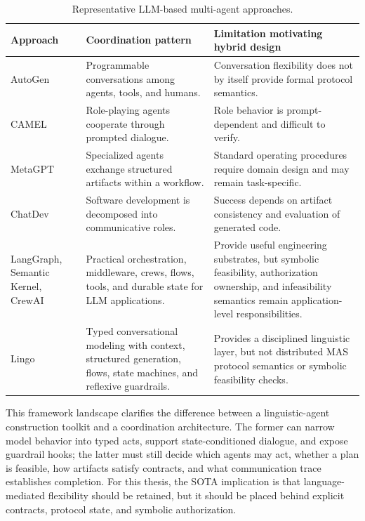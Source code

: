 \begin{table}[htbp]
\centering
\caption{Representative LLM-based multi-agent approaches.}
\label{tab:llm-mas}
\begin{tabular}{p{}p{}p{}}
\toprule
\textbf{Approach} & \textbf{Coordination pattern} & \textbf{Limitation motivating hybrid design} \\
\midrule
AutoGen & Programmable conversations among agents, tools, and humans. & Conversation flexibility does not by itself provide formal protocol semantics. \\
CAMEL & Role-playing agents cooperate through prompted dialogue. & Role behavior is prompt-dependent and difficult to verify. \\
MetaGPT & Specialized agents exchange structured artifacts within a workflow. & Standard operating procedures require domain design and may remain task-specific. \\
ChatDev & Software development is decomposed into communicative roles. & Success depends on artifact consistency and evaluation of generated code. \\
LangGraph, Semantic Kernel, CrewAI & Practical orchestration, middleware, crews, flows, tools, and durable state for LLM applications. & Provide useful engineering substrates, but symbolic feasibility, authorization ownership, and infeasibility semantics remain application-level responsibilities. \\
Lingo & Typed conversational modeling with context, structured generation, flows, state machines, and reflexive guardrails. & Provides a disciplined linguistic layer, but not distributed MAS protocol semantics or symbolic feasibility checks. \\
\bottomrule
\end{tabular}
\end{table}

This framework landscape clarifies the difference between a linguistic-agent construction toolkit and a coordination architecture. The former can narrow model behavior into typed acts, support state-conditioned dialogue, and expose guardrail hooks; the latter must still decide which agents may act, whether a plan is feasible, how artifacts satisfy contracts, and what communication trace establishes completion. For this thesis, the SOTA implication is that language-mediated flexibility should be retained, but it should be placed behind explicit contracts, protocol state, and symbolic authorization.

